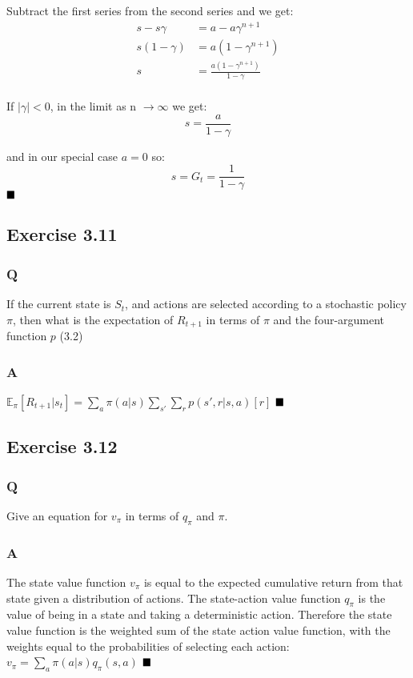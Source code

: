 Subtract the first series from the second series and we get:
\begin{align}
s -s\gamma &= a - a\gamma^{n+1} \\
s(1 - \gamma) &= a(1 - \gamma^{n+1}) \\
s &= \frac{a(1 - \gamma^{n+1})}{1 - \gamma} \\
\end{align}

If $|\gamma| < 0$,  in the limit as n $\rightarrow \infty$ we get:
\begin{equation}
s = \frac{a}{1 - \gamma}
\end{equation}

and in our special case $a = 0$ so:
\begin{equation}
s = G_t =  \frac{1}{1 - \gamma}
\end{equation}
$
\hfill \blacksquare
$

\subsection{Exercise 3.11}
\subsubsection*{Q}
If the current state is $S_t$, and actions are selected according to a stochastic policy \(\pi\), then what is the expectation of $R_{t+1}$ in terms of $\pi$ and the four-argument function \(p\) (3.2) 

\subsubsection*{A}
$
\mathbb{E}_\pi[R_{t+1} | s_t] = \sum_{a} \pi(a | s) \sum_{s'} \sum_{r} p(s', r | s, a) [r] 
$
$
\hfill \blacksquare
$

\subsection{Exercise 3.12}
\subsubsection*{Q}
Give an equation for $v_\pi$ in terms of $q_\pi$ and $\pi$. 

\subsubsection*{A}
The state value function \(v_\pi\) is equal to the expected cumulative return from that state given a distribution of actions. The state-action value function \(q_\pi\) is the value of being in a state and taking a deterministic action. Therefore the state value function is the weighted sum of the state action value function, with the weights equal to the probabilities of selecting each action:
$
v_\pi = \sum_{a} \pi(a | s) q_\pi(s,a) 
$
$
\hfill \blacksquare
$

